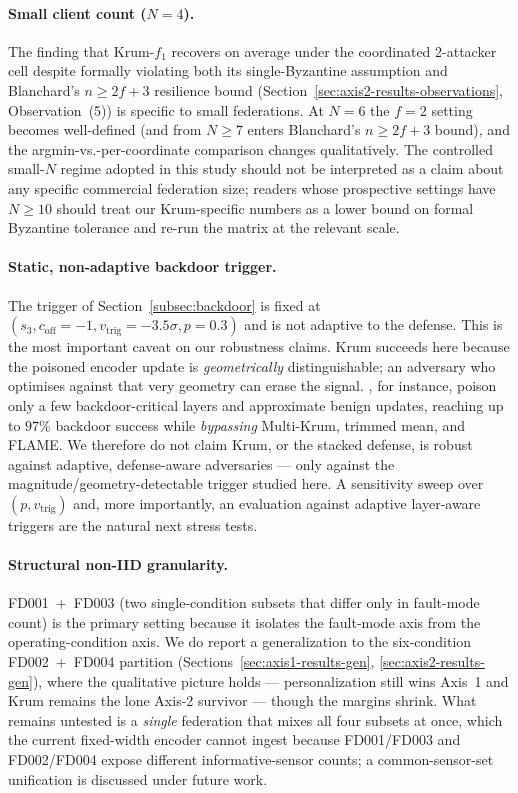 \documentclass[a4paper,fleqn,doubleblind]{cas-sc}
\begin{document}
\paragraph{Small client count ($N = 4$).}
The finding that Krum-$f_1$ recovers on average under the
coordinated 2-attacker cell despite formally violating both its
single-Byzantine assumption and Blanchard's $n \geq 2f + 3$
resilience bound
(Section~\ref{sec:axis2-results-observations}, Observation~(5)) is
specific to small federations. At $N = 6$ the $f = 2$ setting becomes
well-defined (and from $N \geq 7$ enters Blanchard's $n \geq 2f + 3$
bound), and the argmin-vs.-per-coordinate comparison changes
qualitatively. The controlled small-$N$ regime
adopted in this study should not be interpreted as a claim about
any specific commercial federation size; readers whose prospective
settings have $N \geq 10$ should treat our Krum-specific numbers
as a lower bound on formal Byzantine tolerance and re-run the
matrix at the relevant scale.

\paragraph{Static, non-adaptive backdoor trigger.}
The trigger of Section~\ref{subsec:backdoor} is fixed at
$(s_3, c_{\mathrm{off}} = -1, v_{\mathrm{trig}} = -3.5\sigma,
p = 0.3)$ and is not adaptive to the defense. This is the most
important caveat on our robustness claims. Krum succeeds here
because the poisoned encoder update is \emph{geometrically}
distinguishable; an adversary who optimises against that very
geometry can erase the signal. \citet{Foroughi2026LSA}, for
instance, poison only a few backdoor-critical layers and approximate
benign updates, reaching up to $97\%$ backdoor success while
\emph{bypassing} Multi-Krum, trimmed mean, and FLAME. We therefore
do not claim Krum, or the stacked defense, is robust against
adaptive, defense-aware adversaries --- only against the
magnitude/geometry-detectable trigger studied here. A sensitivity
sweep over $(p, v_{\mathrm{trig}})$ and, more importantly, an
evaluation against adaptive layer-aware triggers are the natural
next stress tests.

\paragraph{Structural non-IID granularity.}
FD001~$+$~FD003 (two single-condition subsets that differ only in
fault-mode count) is the primary setting because it isolates the
fault-mode axis from the operating-condition axis. We do report a
generalization to the six-condition FD002~$+$~FD004 partition
(Sections~\ref{sec:axis1-results-gen}, \ref{sec:axis2-results-gen}),
where the qualitative picture holds --- personalization still wins
Axis~1 and Krum remains the lone Axis-2 survivor --- though the
margins shrink. What remains untested is a \emph{single} federation
that mixes all four subsets at once, which the current fixed-width
encoder cannot ingest because FD001/FD003 and FD002/FD004 expose
different informative-sensor counts; a common-sensor-set unification
is discussed under future work.
\end{document}
